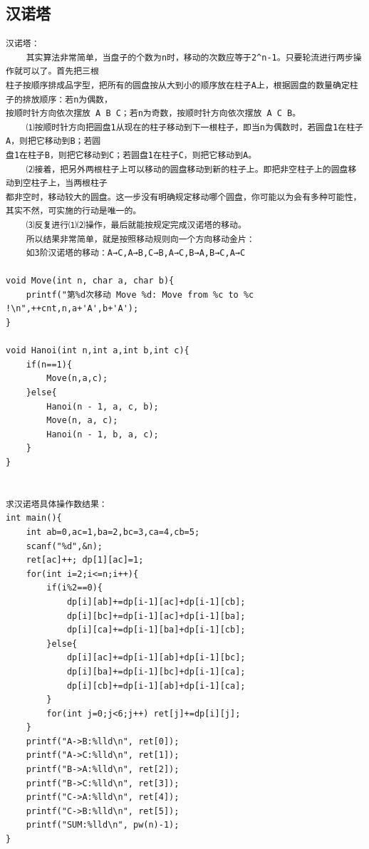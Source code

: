 \documentclass[twoside]{article}
\begin{document}
\subsection{汉诺塔}
\begin{lstlisting}
汉诺塔：
    其实算法非常简单，当盘子的个数为n时，移动的次数应等于2^n-1。只要轮流进行两步操作就可以了。首先把三根
柱子按顺序排成品字型，把所有的圆盘按从大到小的顺序放在柱子A上，根据圆盘的数量确定柱子的排放顺序：若n为偶数，
按顺时针方向依次摆放 A B C；若n为奇数，按顺时针方向依次摆放 A C B。
    ⑴按顺时针方向把圆盘1从现在的柱子移动到下一根柱子，即当n为偶数时，若圆盘1在柱子A，则把它移动到B；若圆
盘1在柱子B，则把它移动到C；若圆盘1在柱子C，则把它移动到A。
    ⑵接着，把另外两根柱子上可以移动的圆盘移动到新的柱子上。即把非空柱子上的圆盘移动到空柱子上，当两根柱子
都非空时，移动较大的圆盘。这一步没有明确规定移动哪个圆盘，你可能以为会有多种可能性，其实不然，可实施的行动是唯一的。
    ⑶反复进行⑴⑵操作，最后就能按规定完成汉诺塔的移动。
    所以结果非常简单，就是按照移动规则向一个方向移动金片：
    如3阶汉诺塔的移动：A→C,A→B,C→B,A→C,B→A,B→C,A→C

void Move(int n, char a, char b){
    printf("第%d次移动 Move %d: Move from %c to %c !\n",++cnt,n,a+'A',b+'A');
}

void Hanoi(int n,int a,int b,int c){
    if(n==1){
        Move(n,a,c);
    }else{
        Hanoi(n - 1, a, c, b);
        Move(n, a, c);
        Hanoi(n - 1, b, a, c);
    }
}


求汉诺塔具体操作数结果：
int main(){
    int ab=0,ac=1,ba=2,bc=3,ca=4,cb=5;
    scanf("%d",&n);
    ret[ac]++; dp[1][ac]=1;
    for(int i=2;i<=n;i++){
        if(i%2==0){
            dp[i][ab]+=dp[i-1][ac]+dp[i-1][cb];
            dp[i][bc]+=dp[i-1][ac]+dp[i-1][ba];
            dp[i][ca]+=dp[i-1][ba]+dp[i-1][cb];
        }else{
            dp[i][ac]+=dp[i-1][ab]+dp[i-1][bc];
            dp[i][ba]+=dp[i-1][bc]+dp[i-1][ca];
            dp[i][cb]+=dp[i-1][ab]+dp[i-1][ca];
        }
        for(int j=0;j<6;j++) ret[j]+=dp[i][j];
    }
    printf("A->B:%lld\n", ret[0]);
    printf("A->C:%lld\n", ret[1]);
    printf("B->A:%lld\n", ret[2]);
    printf("B->C:%lld\n", ret[3]);
    printf("C->A:%lld\n", ret[4]);
    printf("C->B:%lld\n", ret[5]);
    printf("SUM:%lld\n", pw(n)-1);
}\end{lstlisting}
\end{document}
